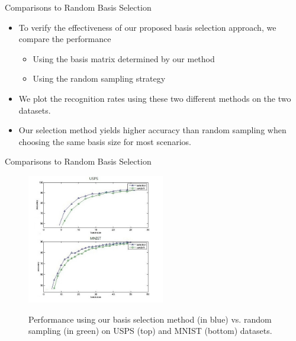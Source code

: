 \documentclass{beamer}
\begin{document}
\begin{frame}{Comparisons to Random Basis Selection}
\begin{itemize}
  \item To verify the effectiveness of our proposed basis selection approach, we compare the performance
\begin{itemize}
  \item Using the basis matrix determined by our method
  \item Using the random sampling strategy
\end{itemize}
\item We plot the recognition rates using these two different methods on the two datasets.
\item Our selection method yields higher accuracy than random sampling when choosing the same basis size for most scenarios.
\end{itemize}

\end{frame}
\begin{frame}{Comparisons to Random Basis Selection}
\begin{figure}[h!]
\centering
\caption{Performance using our basis selection method (in blue) vs. random sampling (in green) on USPS (top) and MNIST (bottom) datasets.}
  \includegraphics[width=6cm]{compare.jpg}
\label{fig:select}
\end{figure}
\end{frame}
\end{document}
